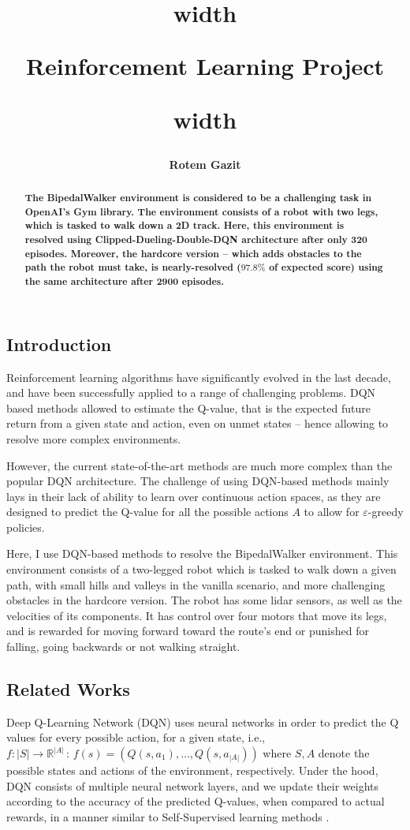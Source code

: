 \documentclass{article}
\title{
\noindent\vrule height 2.5pt width \textwidth
\begin{center}
    \bfseries Reinforcement Learning Project
\end{center}
\noindent\vrule height 2.5pt width \textwidth
}
\author{\bfseries Rotem Gazit}
\date{}
\begin{document}
\maketitle


\begin{abstract}
\bfseries
The BipedalWalker environment is considered to be a challenging task in OpenAI's Gym library. The environment consists of a robot with two legs, which is tasked to walk down a 2D track. Here, this environment is resolved using Clipped-Dueling-Double-DQN architecture after only 320 episodes. Moreover, the hardcore version -- which adds obstacles to the path the robot must take, is nearly-resolved ($97.8\%$ of expected score) using the same architecture after 2900 episodes.
\end{abstract}

\begin{multicols}{2}
\section{Introduction}
Reinforcement learning algorithms have significantly evolved in the last decade, and have been successfully applied to a range of challenging problems. DQN based methods allowed to estimate the Q-value, that is the expected future return from a given state and action, even on unmet states -- hence allowing to resolve more complex environments. 

However, the current state-of-the-art methods are much more complex than the popular DQN architecture. The challenge of using DQN-based methods mainly lays in their lack of ability to learn over continuous action spaces, as they are designed to predict the Q-value for all the possible actions $A$ to allow for $\varepsilon$-greedy policies. 

Here, I use DQN-based methods to resolve the BipedalWalker environment. This environment consists of a two-legged robot which is tasked to walk down a given path, with small hills and valleys in the vanilla scenario, and more challenging obstacles in the hardcore version. The robot has some lidar sensors, as well as the velocities of its components. It has control over four motors that move its legs, and is rewarded for moving forward toward the route's end or punished for falling, going backwards or not walking straight.


\subsection{Related Works}
Deep Q-Learning Network (DQN) uses neural networks in order to predict the Q values for every possible action, for a given state, i.e., $f: |S| \to \mathbb{R}^{|A|} \, : \, f(s) = (Q(s,a_1), \dots, Q(s,a_{|A|}))$ where $S, A$ denote the possible states and actions of the environment, respectively. 
Under the hood, DQN consists of multiple neural network layers, and we update their weights according to the accuracy of the predicted Q-values, when compared to actual rewards, in a manner similar to Self-Supervised learning methods \cite{DQN}. 


\end{multicols}
\end{document}
